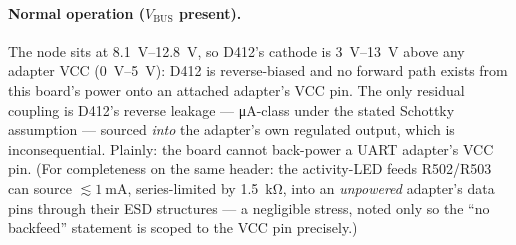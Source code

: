 \paragraph{Normal operation ($V_{\mathrm{BUS}}$ present).} The node sits at
\SIrange{8.1}{12.8}{\volt}, so D412's cathode is \SIrange{3}{13}{\volt} above any
adapter VCC (\SIrange{0}{5}{\volt}): D412 is reverse-biased and no forward path exists
from this board's power onto an attached adapter's VCC pin. The only residual coupling
is D412's reverse leakage --- \si{\micro\ampere}-class under the stated Schottky
assumption --- sourced \emph{into} the adapter's own regulated output, which is
inconsequential. Plainly: the board cannot back-power a UART adapter's VCC pin. (For
completeness on the same header: the activity-LED feeds R502/R503 can source
$\lesssim\SI{1}{\milli\ampere}$, series-limited by \SI{1.5}{\kilo\ohm}, into an
\emph{unpowered} adapter's data pins through their ESD structures --- a negligible
stress, noted only so the ``no backfeed'' statement is scoped to the VCC pin
precisely.)

